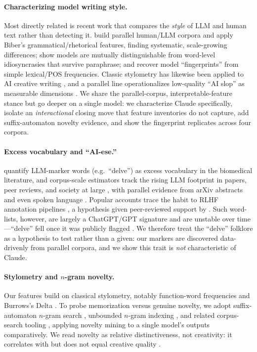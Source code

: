 \documentclass[11pt]{article}
\begin{document}
\paragraph{Characterizing model writing style.}
Most directly related is recent work that compares the \emph{style} of LLM and
human text rather than detecting it. \citet{reinhart2025llmwrite} build parallel
human/LLM corpora and apply Biber's grammatical/rhetorical features, finding
systematic, scale-growing differences; \citet{sun2025idiosyncrasies} show models
are mutually distinguishable from word-level idiosyncrasies that survive paraphrase;
and \citet{mcgovern2024fingerprints} recover model ``fingerprints'' from simple
lexical/POS frequencies. Classic stylometry has likewise been applied to AI
creative writing \citep{osullivan2025stylometry}, and a parallel line operationalizes
low-quality ``AI slop'' as measurable dimensions \citep{shaib2025slop}. We share the
parallel-corpus, interpretable-feature stance but go deeper on a single model: we
characterize Claude specifically, isolate an \emph{interactional} closing move that
feature inventories do not capture, add suffix-automaton novelty evidence, and show
the fingerprint replicates across four corpora.

\paragraph{Excess vocabulary and ``AI-ese.''}
\citet{kobak2024delving} quantify LLM-marker words (e.g.\ ``delve'') as excess
vocabulary in the biomedical literature, and corpus-scale estimators track the
rising LLM footprint in papers, peer reviews, and society at large
\citep{liang2024mapping,liang2024monitoring}, with parallel evidence from arXiv
abstracts \citep{geng2024transforming} and even spoken language
\citep{yakura2024spoken}. Popular accounts trace the habit to RLHF annotation
pipelines \citep{willison2024delve}, a hypothesis given peer-reviewed support by
\citet{juzek2024delve}. Such word-lists, however, are largely a ChatGPT/GPT
signature and are unstable over time---``delve'' fell once it was publicly flagged
\citep{geng2025coevolution}. We therefore treat the ``delve'' folklore as a
hypothesis to test rather than a given: our markers are discovered data-drivenly
from parallel corpora, and we show this trait is \emph{not} characteristic of Claude.

\paragraph{Stylometry and $n$-gram novelty.}
Our features build on classical stylometry, notably function-word frequencies
and Burrows's Delta \citep{burrows2002delta}. To probe memorization
\citep{carlini2023memorization} versus genuine novelty, we adopt suffix-automaton
$n$-gram search \citep{merrill2024rustydawg,merrill2024ngramnovelty}, unbounded
$n$-gram indexing \citep{liu2024infinigram}, and related corpus-search tooling
\citep{elazar2024wimbd}, applying novelty mining to a single model's outputs
comparatively. We read novelty as relative distinctiveness, not creativity: it
correlates with but does not equal creative quality
\citep{lu2024creativityindex,saakyan2026deathofnovelty}.
\end{document}

